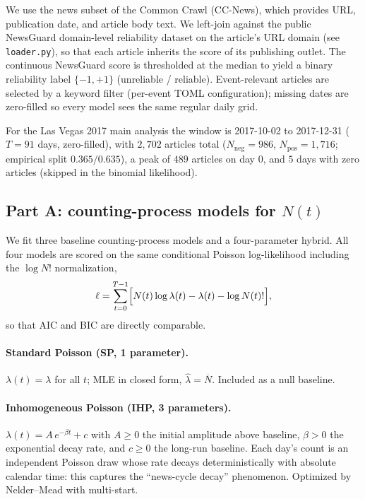 \documentclass[11pt]{article}
\newcommand{\Npos}{N_{\mathrm{pos}}}
\newcommand{\Nneg}{N_{\mathrm{neg}}}
\begin{document}
We use the news subset of the Common Crawl (CC-News), which provides URL,
publication date, and article body text. We left-join against the public
NewsGuard domain-level reliability dataset on the article's URL domain
(see \texttt{loader.py}), so that each article inherits the score of its
publishing outlet. The continuous NewsGuard score is thresholded at the
median to yield a binary reliability label $\{-1,+1\}$ (unreliable /
reliable). Event-relevant articles are selected by a keyword filter
(per-event TOML configuration); missing dates are zero-filled so every model
sees the same regular daily grid.

For the Las Vegas 2017 main analysis the window is 2017-10-02 to 2017-12-31
($T=91$ days, zero-filled), with $2{,}702$ articles total
($\Nneg=986$, $\Npos=1{,}716$; empirical split $0.365/0.635$), a peak of
$489$ articles on day 0, and $5$ days with zero articles (skipped in the
binomial likelihood).

\subsection{Part A: counting-process models for $N(t)$}
\label{sec:partA-models}

We fit three baseline counting-process models and a four-parameter
hybrid. All four models are scored on the same conditional Poisson
log-likelihood including the $\log N!$ normalization,
\begin{equation}
  \ell = \sum_{t=0}^{T-1}\Bigl[N(t)\log\lambda(t) - \lambda(t) - \log N(t)!\Bigr],
  \label{eq:poisson-LL}
\end{equation}
so that AIC and BIC are directly comparable.

\paragraph{Standard Poisson (SP, 1 parameter).}
$\lambda(t)=\lambda$ for all $t$; MLE in closed form,
$\hat\lambda=\overline{N}$. Included as a null baseline.

\paragraph{Inhomogeneous Poisson (IHP, 3 parameters).}
$\lambda(t)=A\,e^{-\beta t}+c$ with $A\!\geq\!0$ the initial amplitude above
baseline, $\beta\!>\!0$ the exponential decay rate, and $c\!\geq\!0$ the
long-run baseline. Each day's count is an independent Poisson draw whose rate
decays deterministically with absolute calendar time: this captures the
``news-cycle decay'' phenomenon. Optimized by Nelder--Mead with multi-start.
\end{document}
